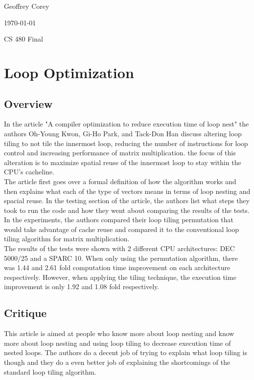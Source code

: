 \documentclass[letterpaper,10pt,titlepage]{article}
\def\name{Geoffrey Corey}
\begin{document}
\hfill \name

\hfill \today

\hfill CS 480 Final

\section*{Loop Optimization}
\subsection*{Overview}
In the article "A compiler optimization to reduce execution time of loop nest" 
the authors Oh-Young Kwon, Gi-Ho Park, and Tack-Don Han discuss altering
loop tiling to not tile the innermost loop, reducing the number of 
instructions for loop control and increasing performance of matrix 
multiplication. the focus of this alteration is to maximize spatial reuse of 
the innermost loop to stay within the CPU's cacheline.\\

The article first goes over a formal definition of how the algorithm works and
then explains what each of the type of vectors means in terms of loop nesting
and spacial reuse. In the testing section of the article, the authors list
what steps they took to run the code and how they went about comparing the
results of the tests. In the experiments, the authors compared their loop
tiling permutation that would take advantage of cache reuse and compared it to
the conventional loop tiling algorithm for matrix multiplication.\\

The results of the tests were shown with 2 different CPU architectures:
DEC 5000/25 and a SPARC 10. When only using the permutation algorithm, there
was 1.44 and 2.61 fold computation time improvement on each architecture
respectively. However, when applying the tiling technique, the execution time
improvement is only 1.92 and 1.08 fold respectively.

\subsection*{Critique}
This article is aimed at people who know more about loop nesting and know more
about loop nesting and using loop tiling to decrease execution time of nested
loops. The authors do a decent job of trying to explain what loop tiling is
though and they do a even better job of explaining the shortcomings of the
standard loop tiling algorithm.\\
\end{document}
